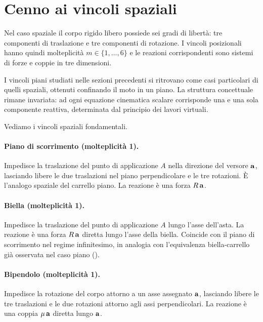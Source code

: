 \section{Cenno ai vincoli spaziali}\label{sec:spaziali}

Nel caso spaziale il corpo rigido libero possiede sei gradi
di libertà: tre componenti di traslazione e tre componenti
di rotazione. I vincoli posizionali hanno quindi molteplicità
$m \in \{1,\ldots,6\}$ e le reazioni corrispondenti sono
sistemi di forze e coppie in tre dimensioni.

I vincoli piani studiati nelle sezioni precedenti si
ritrovano come casi particolari di quelli spaziali,
ottenuti confinando il moto in un piano. La struttura
concettuale rimane invariata: ad ogni equazione cinematica
scalare corrisponde una e una sola componente reattiva,
determinata dal principio dei lavori virtuali.

Vediamo i vincoli spaziali fondamentali.

\paragraph{Piano di scorrimento (molteplicità 1).}
Impedisce la traslazione del punto di applicazione $A$
nella direzione del versore $\mathbf{a}$, lasciando libere le
due traslazioni nel piano perpendicolare e le tre
rotazioni. È l'analogo spaziale del carrello piano.
La reazione è una forza $R\,\mathbf{a}$.

\paragraph{Biella (molteplicità 1).}
Impedisce la traslazione del punto di applicazione $A$
lungo l'asse dell'asta. La reazione è una forza $R\,\mathbf{a}$
diretta lungo l'asse della biella. Coincide con il piano
di scorrimento nel regime infinitesimo, in analogia con
l'equivalenza biella-carrello già osservata nel caso
piano ().

\paragraph{Bipendolo (molteplicità 1).}
Impedisce la rotazione del corpo attorno a un asse
assegnato $\mathbf{a}$, lasciando libere le tre traslazioni e
le due rotazioni attorno agli assi perpendicolari. La
reazione è una coppia $\mu\,\mathbf{a}$ diretta lungo $\mathbf{a}$.

